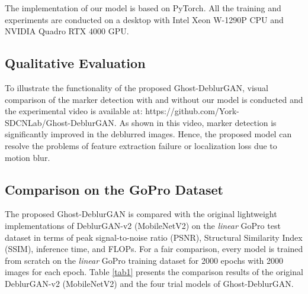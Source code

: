\documentclass[letterpaper, 10 pt, conference]{ieeeconf}
\begin{document}
The implementation of our model is based on PyTorch. All the training and experiments are conducted on a desktop with Intel Xeon W-1290P CPU and NVIDIA Quadro RTX 4000 GPU.


\subsection{Qualitative Evaluation}
To illustrate the functionality of the proposed Ghost-DeblurGAN, visual comparison of the marker detection with and without our model is conducted and the experimental video is available at: https://github.com/York-SDCNLab/Ghost-DeblurGAN. As shown in this video, marker detection is significantly improved in the deblurred images. Hence, the proposed model can resolve the problems of feature extraction failure or localization loss due to motion blur.




\subsection{Comparison on the GoPro Dataset}
The proposed Ghost-DeblurGAN is compared with the original lightweight implementations of DeblurGAN-v2 (MobileNetV2) \cite{deblurgan2} on the \textit{linear} GoPro test dataset \cite{deblurgan2,nah} in terms of peak signal-to-noise ratio (PSNR), Structural Similarity Index (SSIM), inference time, and FLOPs. For a fair comparison, every model is trained from scratch on the \textit{linear} GoPro training dataset \cite{deblurgan2,nah} for 2000 epochs with 2000 images for each epoch. Table \ref{tab1} presents the comparison results of the original DeblurGAN-v2 (MobileNetV2) \cite{deblurgan2} and the four trial models of Ghost-DeblurGAN.
\end{document}
